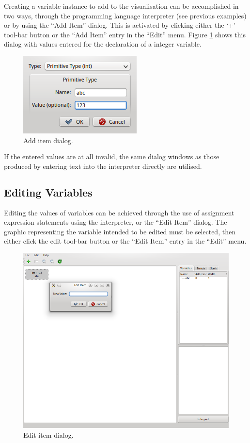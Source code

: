 \documentclass[a4paper,11pt]{article}
\begin{document}
Creating a variable instance to add to the visualisation can be accomplished in two ways, through the programming language interpreter (see previous examples) or by using the ``Add Item'' dialog.
This is activated by clicking either the `+' tool-bar button or the ``Add Item'' entry in the ``Edit'' menu.
Figure \ref{fig:addint1} shows this dialog with values entered for the declaration of a integer variable.
\begin{figure}[h!]
\centering
\includegraphics{addint1}
\caption{Add item dialog.}
\label{fig:addint1}
\end{figure}
If the entered values are at all invalid, the same dialog windows as those produced by entering text into the interpreter directly are utilised.

\subsection{Editing Variables}

Editing the values of variables can be achieved through the use of assignment expression statements using the interpreter, or the ``Edit Item'' dialog.
The graphic representing the variable intended to be edited must be selected, then either click the edit tool-bar button or the ``Edit Item'' entry in the ``Edit'' menu.
\begin{figure}[h!]
\centering
\includegraphics[trim=0 100mm 100mm 0,clip]{editint1}
\caption{Edit item dialog.}
\label{fig:editint1}
\end{figure}
\end{document}
